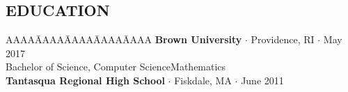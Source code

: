 \documentclass{res}
\begin{document}
\begin{resume}
\myvspace
\section{EDUCATION}     
\myvspace
\begin{tabbing}
AAAA\=AAAA\=AAAA\=AAAA\=AAAA\kill
{\bf Brown University} $\cdot$ Providence, RI $\cdot$ May 2017\\
	\>Bachelor of Science, Computer Science\textemdash Mathematics\\
\sbreak
{\bf Tantasqua Regional High School} $\cdot$ Fiskdale, MA $\cdot$ June 2011\\%
\end{tabbing}
\sectionVspace %

\end{resume}
\end{document}
